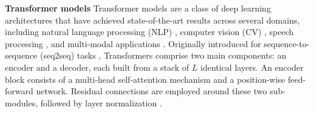 %
%
%
%
%
%
%
%
%
%
%
%
%
\textbf{Transformer models} Transformer models \cite{vaswaniAttentionAllYou2017} are a class of deep learning architectures that have achieved state-of-the-art results across several domains, including natural language processing (NLP) \cite{devlinBERTPretrainingDeep2019, Perez_sentiment_2021, Raffel_T5_2020}, computer vision (CV) \cite{dosovitskiyImageWorth16x162021}, speech processing \cite{hsuHuBERTSelfSupervisedSpeech2021}, and multi-modal applications \cite{Li_Li_Xiong_Hoi_2022}. Originally introduced for sequence-to-sequence (seq2seq) tasks \cite{Sutskever_Vinyals_Le_2014}, Transformers comprise two main components: an encoder and a decoder, each built from a stack of $L$ identical layers. An encoder block consists of a multi-head self-attention mechanism and a position-wise feed-forward network. Residual connections \cite{He_Zhang_Ren_Sun_2016} are employed around these two sub-modules, followed by layer normalization \cite{Ba_Kiros_Hinton_2016}.
